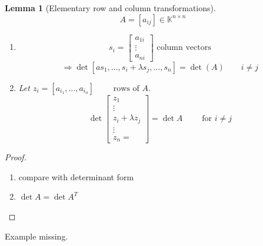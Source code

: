 \documentclass[a4paper,landscape,twocolumn]{article}
\newtheorem{lemma}{Lemma}
\begin{document}
\begin{lemma}[Elementary row and column transformations]
  \label{lemma-7.33}
  \[ A = [a_{ij}] \in \mathbb K^{n \times n} \]
  \begin{enumerate}
    \item
      \[ s_i = \begin{bmatrix} a_{1i} \\ \vdots \\ a_{ni }\end{bmatrix} \text{ column vectors} \]
      \[ \Rightarrow \det[as_1, \ldots, s_i + \lambda s_j, \ldots, s_n] = \det(A) \qquad i \neq j \]
    \item
      Let $z_i = [a_{i_1}, \ldots, a_{i_n}] \qquad \text{ rows of $A$}$.
      \[ \det\begin{bmatrix} z_1 \\ \vdots \\ z_i + \lambda z_j \\ \vdots \\ z_n = \end{bmatrix} = \det{A} \qquad \text{ for } i \neq j \]
  \end{enumerate}
\end{lemma}
\begin{proof}
  \begin{enumerate}
    \item compare with determinant form
    \item $\det{A} = \det{A^T}$
  \end{enumerate}
\end{proof}

Example missing.

\clearpage
\begin{otherlanguage}{ngerman}
\printindex[German]
\end{otherlanguage}
\printindex[English]
\end{document}
